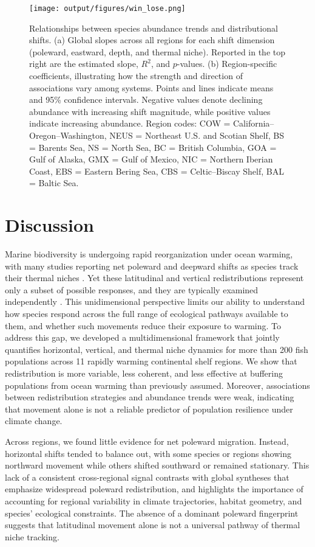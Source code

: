 \documentclass[11pt]{article}
\begin{document}
\begin{spacing}{1.5}
\begin{figure}[h]
    \centering
    \texttt{[image: output/figures/win\_lose.png]}
    \caption{
 Relationships between species abundance trends and distributional shifts. (a) Global slopes across all regions for each shift dimension (poleward, eastward, depth, and thermal niche). Reported in the top right are the estimated slope, $R^2$, and $p$-values. (b) Region-specific coefficients, illustrating how the strength and direction of associations vary among systems. Points and lines indicate means and 95\% confidence intervals. Negative values denote declining abundance with increasing shift magnitude, while positive values indicate increasing abundance. Region codes: COW = California–Oregon–Washington, NEUS = Northeast U.S. and Scotian Shelf, BS = Barents Sea, NS = North Sea, BC = British Columbia, GOA = Gulf of Alaska, GMX = Gulf of Mexico, NIC = Northern Iberian Coast, EBS = Eastern Bering Sea, CBS = Celtic–Biscay Shelf, BAL = Baltic Sea.}
    \label{fig:win_lose}
\end{figure}


\section{Discussion}

Marine biodiversity is undergoing rapid reorganization under ocean warming, with many studies reporting net poleward and deepward shifts as species track their thermal niches \citep{parmesan_globally_2003, perry_climate_2005, dulvy_climate_2008}. Yet these latitudinal and vertical redistributions represent only a subset of possible responses, and they are typically examined independently \citep{fredston_reimagining_2025}. This unidimensional perspective limits our ability to understand how species respond across the full range of ecological pathways available to them, and whether such movements reduce their exposure to warming. To address this gap, we developed a multidimensional framework that jointly quantifies horizontal, vertical, and thermal niche dynamics for more than 200 fish populations across 11 rapidly warming continental shelf regions. We show that redistribution is more variable, less coherent, and less effective at buffering populations from ocean warming than previously assumed. Moreover, associations between redistribution strategies and abundance trends were weak, indicating that movement alone is not a reliable predictor of population resilience under climate change.

Across regions, we found little evidence for net poleward migration. Instead, horizontal shifts tended to balance out, with some species or regions showing northward movement while others shifted southward or remained stationary. This lack of a consistent cross-regional signal contrasts with global syntheses that emphasize widespread poleward redistribution, and highlights the importance of accounting for regional variability in climate trajectories, habitat geometry, and species’ ecological constraints. The absence of a dominant poleward fingerprint suggests that latitudinal movement alone is not a universal pathway of thermal niche tracking.



\end{spacing}
\end{document}
